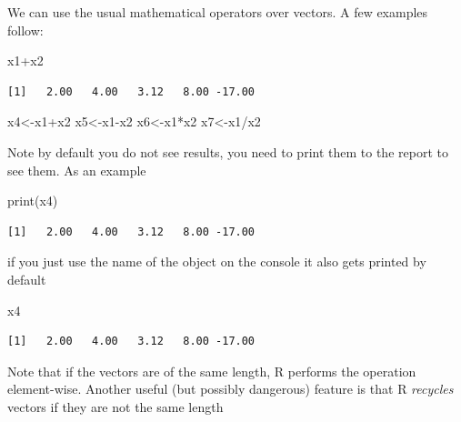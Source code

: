 \documentclass[
  letterpaper,
  DIV=11,
  numbers=noendperiod]{scrartcl}
\newenvironment{Shaded}{\begin{snugshade}}{\end{snugshade}}
\newcommand{\FunctionTok}[1]{\textcolor[rgb]{0.28,0.35,0.67}{#1}}
\newcommand{\NormalTok}[1]{\textcolor[rgb]{0.00,0.23,0.31}{#1}}
\newcommand{\OtherTok}[1]{\textcolor[rgb]{0.00,0.23,0.31}{#1}}
\newcommand{\SpecialCharTok}[1]{\textcolor[rgb]{0.37,0.37,0.37}{#1}}
\begin{document}
We can use the usual mathematical operators over vectors. A few examples
follow:

\begin{Shaded}
\begin{Highlighting}[]
\NormalTok{x1}\SpecialCharTok{+}\NormalTok{x2}
\end{Highlighting}
\end{Shaded}

\begin{verbatim}
[1]   2.00   4.00   3.12   8.00 -17.00
\end{verbatim}

\begin{Shaded}
\begin{Highlighting}[]
\NormalTok{x4}\OtherTok{\textless{}{-}}\NormalTok{x1}\SpecialCharTok{+}\NormalTok{x2}
\NormalTok{x5}\OtherTok{\textless{}{-}}\NormalTok{x1}\SpecialCharTok{{-}}\NormalTok{x2}
\NormalTok{x6}\OtherTok{\textless{}{-}}\NormalTok{x1}\SpecialCharTok{*}\NormalTok{x2}
\NormalTok{x7}\OtherTok{\textless{}{-}}\NormalTok{x1}\SpecialCharTok{/}\NormalTok{x2}
\end{Highlighting}
\end{Shaded}

Note by default you do not see results, you need to print them to the
report to see them. As an example

\begin{Shaded}
\begin{Highlighting}[]
\FunctionTok{print}\NormalTok{(x4)}
\end{Highlighting}
\end{Shaded}

\begin{verbatim}
[1]   2.00   4.00   3.12   8.00 -17.00
\end{verbatim}

if you just use the name of the object on the console it also gets
printed by default

\begin{Shaded}
\begin{Highlighting}[]
\NormalTok{x4}
\end{Highlighting}
\end{Shaded}

\begin{verbatim}
[1]   2.00   4.00   3.12   8.00 -17.00
\end{verbatim}

Note that if the vectors are of the same length, R performs the
operation element-wise. Another useful (but possibly dangerous) feature
is that R \emph{recycles} vectors if they are not the same length
\end{document}
